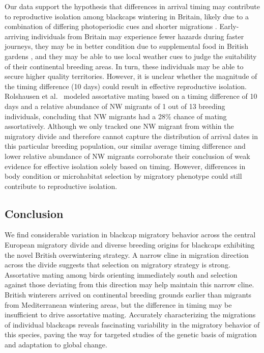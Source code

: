 \documentclass[a4paper, nobind]{templates/ociamthesis}
\begin{document}
Our data support the hypothesis that differences in arrival timing may contribute to reproductive isolation among blackcaps wintering in Britain, likely due to a combination of differing photoperiodic cues and shorter migrations \autocite{terrillEcophysiologicalAspectsRapid1990}.
Early-arriving individuals from Britain may experience fewer hazards during faster journeys, they may be in better condition due to supplemental food in British gardens \autocite{bearhopAssortativeMatingMechanism2005,plummerSupplementaryFeedingGardens2015}, and they may be able to use local weather cues to judge the suitability of their continental breeding areas.
In turn, these individuals may be able to secure higher quality territories.
However, it is unclear whether the magnitude of the timing difference (10 days) could result in effective reproductive isolation.
Rolshausen et al.~\autocite*{rolshausenSpringArrivalMigratory2010} modeled assortative mating based on a timing difference of 10 days and a relative abundance of NW migrants of 1 out of 13 breeding individuals, concluding that NW migrants had a 28\% chance of mating assortatively.
Although we only tracked one NW migrant from within the migratory divide and therefore cannot capture the distribution of arrival dates in this particular breeding population, our similar average timing difference and lower relative abundance of NW migrants corroborate their conclusion of weak evidence for effective isolation solely based on timing.
However, differences in body condition or microhabitat selection by migratory phenotype \autocite{rolshausenSpringArrivalMigratory2010} could still contribute to reproductive isolation.

\hypertarget{conclusion}{%
\subsection{Conclusion}\label{conclusion}}

We find considerable variation in blackcap migratory behavior across the central European migratory divide and diverse breeding origins for blackcaps exhibiting the novel British overwintering strategy. A narrow cline in migration direction across the divide suggests that selection on migratory strategy is strong. Assortative mating among birds orienting immediately south and selection against those deviating from this direction may help maintain this narrow cline. British winterers arrived on continental breeding grounds earlier than migrants from Mediterranean wintering areas, but the difference in timing may be insufficient to drive assortative mating. Accurately characterizing the migrations of individual blackcaps reveals fascinating variability in the migratory behavior of this species, paving the way for targeted studies of the genetic basis of migration and adaptation to global change.
\end{document}
